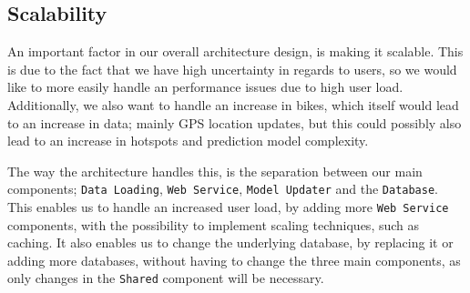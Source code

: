 \subsection{Scalability}
An important factor in our overall architecture design, is making it scalable.
This is due to the fact that we have high uncertainty in regards to users, so we would like to more easily handle an performance issues due to high user load.
Additionally, we also want to handle an increase in bikes, which itself would lead to an increase in data; mainly GPS location updates, but this could possibly also lead to an increase in hotspots and prediction model complexity.

The way the architecture handles this, is the separation between our main components; \texttt{Data Loading}, \texttt{Web Service}, \texttt{Model Updater} and the \texttt{Database}.
This enables us to handle an increased user load, by adding more \texttt{Web Service} components, with the possibility to implement scaling techniques, such as caching.\cite{scalability}
It also enables us to change the underlying database, by replacing it or adding more databases, without having to change the three main components, as only changes in the \texttt{Shared} component will be necessary.
